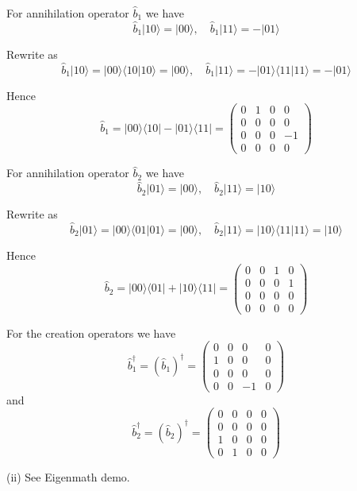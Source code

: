For annihilation operator $\hat b_1$ we have
\begin{equation*}
\hat b_1|10\rangle=|00\rangle,
\quad
\hat b_1|11\rangle=-|01\rangle
\end{equation*}

Rewrite as
\begin{equation*}
\hat b_1|10\rangle=|00\rangle\langle10|10\rangle=|00\rangle,
\quad
\hat b_1|11\rangle=-|01\rangle\langle11|11\rangle=-|01\rangle
\end{equation*}

Hence
\begin{equation*}
\hat b_1=|00\rangle\langle10|-|01\rangle\langle11|
=\begin{pmatrix}0&1&0&0\\0&0&0&0\\0&0&0&-1\\0&0&0&0\end{pmatrix}
\end{equation*}

For annihilation operator $\hat b_2$ we have
\begin{equation*}
\hat b_2|01\rangle=|00\rangle,
\quad
\hat b_2|11\rangle=|10\rangle
\end{equation*}

Rewrite as
\begin{equation*}
\hat b_2|01\rangle=|00\rangle\langle01|01\rangle=|00\rangle,
\quad
\hat b_2|11\rangle=|10\rangle\langle11|11\rangle=|10\rangle
\end{equation*}

Hence
\begin{equation*}
\hat b_2=|00\rangle\langle01|+|10\rangle\langle11|
=\begin{pmatrix}0&0&1&0\\0&0&0&1\\0&0&0&0\\0&0&0&0\end{pmatrix}
\end{equation*}

For the creation operators we have
\begin{equation*}
\hat b_1^\dag=(\hat b_1)^\dag=\begin{pmatrix}0&0&0&0\\1&0&0&0\\0&0&0&0\\0&0&-1&0\end{pmatrix}
\end{equation*}
and
\begin{equation*}
\hat b_2^\dag=(\hat b_2)^\dag=\begin{pmatrix}0&0&0&0\\0&0&0&0\\1&0&0&0\\0&1&0&0\end{pmatrix}
\end{equation*}

(ii) See Eigenmath demo.


